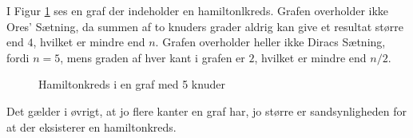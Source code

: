 \begin{exmp}
I Figur \ref{pentagon} ses en graf der indeholder en hamiltonlkreds.
Grafen overholder ikke Ores' Sætning, da summen af to knuders grader aldrig kan give et resultat større end $4$, hvilket er mindre end $n$.
Grafen overholder heller ikke Diracs Sætning, fordi $n=5$, mens graden af hver kant i grafen er $2$, hvilket er mindre end $n/2$.


\begin{figure}[h]
\centering

\caption{Hamiltonkreds i en graf med 5 knuder}
\label{pentagon}
\end{figure}

\end{exmp}

Det gælder i øvrigt, at jo flere kanter en graf har, jo større er sandsynligheden for at der eksisterer en hamiltonkreds. 